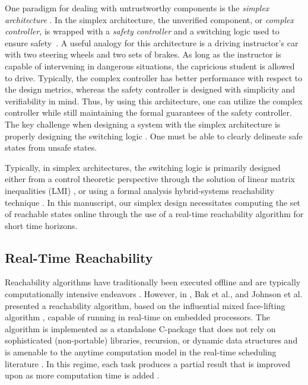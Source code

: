 \documentclass[manuscript,screen,review]{acmart}
\begin{document}
One paradigm for dealing with untrustworthy components is the \emph{simplex architecture} \cite{RiveraAnArchitectural1996}. In the simplex architecture, the unverified component, or \emph{complex controller}, is wrapped with a \emph{safety controller} and a switching logic used to ensure safety~\cite{Bak2014}. A useful analogy for this architecture is a driving instructor's car with two steering wheels and two sets of brakes. As long as the instructor is capable of intervening in dangerous situations, the capricious student is allowed to drive. Typically, the complex controller has better performance with respect to the design metrics, whereas the safety controller is designed with simplicity and verifiability in mind. Thus, by using this architecture, one can utilize the complex controller while still maintaining the formal guarantees of the safety controller. The key challenge when designing a system with the simplex architecture is properly designing the switching logic \cite{Johnson2016}. One must be able to clearly delineate safe states from unsafe states. 

Typically, in simplex architectures, the switching logic is primarily designed either from a control theoretic perspective through the solution of linear matrix inequalities (LMI) \cite{SetoCaseStudy2000}, or using a formal analysis hybrid-systems reachability technique \cite{Bak2009Simplex}. In this manuscript, our simplex design necessitates computing the set of reachable states online through the use of a real-time reachability algorithm for short time horizons.

\subsection{Real-Time Reachability}

Reachability algorithms have traditionally been executed offline and are typically computationally intensive endeavors \cite{Chen2013,AlthoffCORA2015,manzanas2019arch_ainncs}. However, in \cite{Bak2014,Johnson2016}, Bak et al., and Johnson et al. presented a reachability algorithm, based on the influential mixed face-lifting algorithm \cite{dang2000}, capable of running in real-time on embedded processors. The algorithm is implemented as a standalone C-package that does not rely on sophisticated (non-portable) libraries, recursion, or dynamic data structures and is amenable to the anytime computation model in the real-time scheduling literature \cite{Liu1991}. In this regime, each task produces a partial result that is improved upon as more computation time is added \cite{Johnson2016}. 
\end{document}
